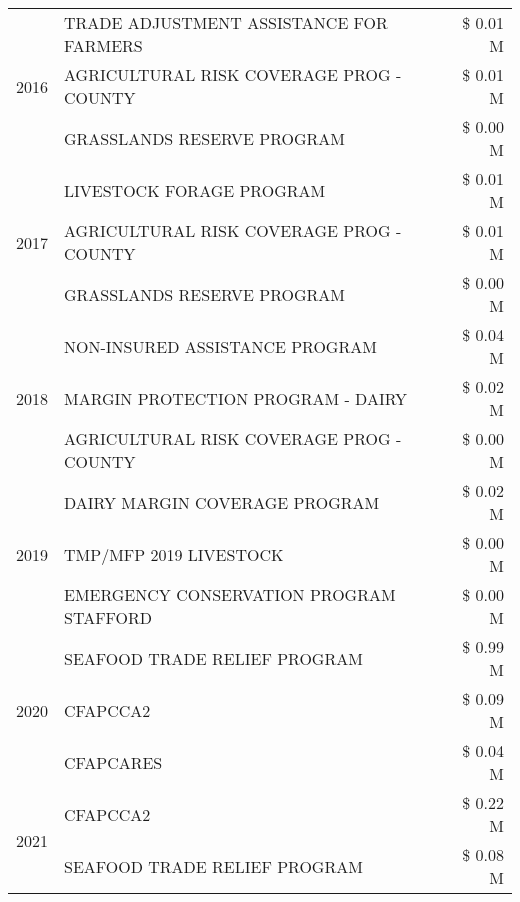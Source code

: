 \begin{tabular}{llr}
\cline{1-3}
\multirow[t]{3}{*}{2016} & TRADE ADJUSTMENT ASSISTANCE FOR FARMERS & \$ 0.01 M \\
 & AGRICULTURAL RISK COVERAGE PROG - COUNTY & \$ 0.01 M \\
 & GRASSLANDS RESERVE PROGRAM & \$ 0.00 M \\
\cline{1-3}
\multirow[t]{3}{*}{2017} & LIVESTOCK FORAGE PROGRAM & \$ 0.01 M \\
 & AGRICULTURAL RISK COVERAGE PROG - COUNTY & \$ 0.01 M \\
 & GRASSLANDS RESERVE PROGRAM & \$ 0.00 M \\
\cline{1-3}
\multirow[t]{3}{*}{2018} & NON-INSURED ASSISTANCE PROGRAM & \$ 0.04 M \\
 & MARGIN PROTECTION PROGRAM - DAIRY & \$ 0.02 M \\
 & AGRICULTURAL RISK COVERAGE PROG - COUNTY & \$ 0.00 M \\
\cline{1-3}
\multirow[t]{3}{*}{2019} & DAIRY MARGIN COVERAGE PROGRAM & \$ 0.02 M \\
 & TMP/MFP 2019 LIVESTOCK & \$ 0.00 M \\
 & EMERGENCY CONSERVATION PROGRAM STAFFORD & \$ 0.00 M \\
\cline{1-3}
\multirow[t]{3}{*}{2020} & SEAFOOD TRADE RELIEF PROGRAM & \$ 0.99 M \\
 & CFAPCCA2 & \$ 0.09 M \\
 & CFAPCARES & \$ 0.04 M \\
\cline{1-3}
\multirow[t]{2}{*}{2021} & CFAPCCA2 & \$ 0.22 M \\
 & SEAFOOD TRADE RELIEF PROGRAM & \$ 0.08 M \\
\cline{1-3}
\bottomrule
\end{tabular}
